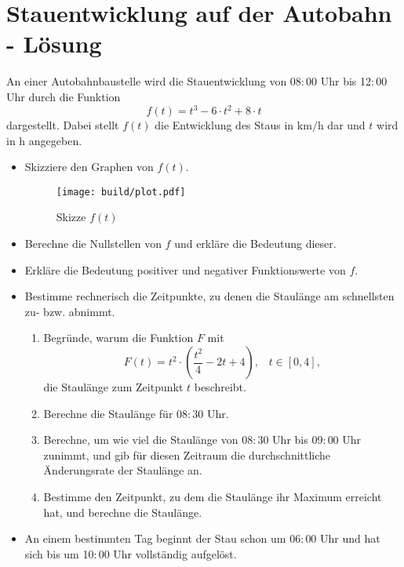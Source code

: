 



\section*{Stauentwicklung auf der Autobahn - Lösung}

An einer Autobahnbaustelle wird die Stauentwicklung von 08$:$00 Uhr bis 12$:$00 Uhr durch die Funktion
\begin{equation*}
    f(t) = t^3-6\cdot t^2+8\cdot t
\end{equation*}
dargestellt.
Dabei stellt $f(t)$ die Entwicklung des Staus in $\si{\kilo\meter\per\hour}$ dar und $t$ wird in $\si{\hour}$ angegeben.

\begin{itemize}
    \item Skizziere den Graphen von $f(t)$.
        \begin{figure}[H]
            \centering
            \texttt{[image: build/plot.pdf]}
            \caption{Skizze $f(t)$}
            \label{fig:f(t)}
        \end{figure}
    \item Berechne die Nullstellen von $f$ und erkläre die Bedeutung dieser.
    \item Erkläre die Bedeutung positiver und negativer Funktionswerte von $f$.
    \item Bestimme rechnerisch die Zeitpunkte, zu denen die Staulänge am schnellsten zu- bzw. abnimmt.
        \begin{enumerate}
             \item Begründe, warum die Funktion $F$ mit
             \begin{equation}
                   F(t) = t^2\cdot\left(\frac{t^2}{4}-2t+4\right), \;\;\; t \in \left[0,4\right],
             \end{equation}
             die Staulänge zum Zeitpunkt $t$ beschreibt.
             \item Berechne die Staulänge für 08$:$30 Uhr.
             \item Berechne, um wie viel die Staulänge von 08$:$30 Uhr bis 09$:$00 Uhr zunimmt, und gib für diesen Zeitraum die durchschnittliche Änderungsrate der Staulänge an.
             \item Bestimme den Zeitpunkt, zu dem die Staulänge ihr Maximum erreicht hat, und berechne die Staulänge.
         \end{enumerate}
     \item An einem bestimmten Tag beginnt der Stau schon um 06$:$00 Uhr und hat sich bis um 10$:$00 Uhr vollständig aufgelöst.

\end{itemize}
